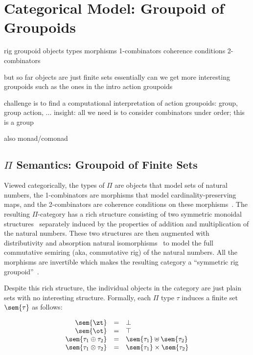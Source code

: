 \section{Categorical Model: Groupoid of Groupoids}
\label{sec:groupoids}

rig groupoid
objects types
morphisms 1-combinators
coherence conditions 2-combinators

but so far objects are just finite sets essentially
can we get more interesting groupoids such as the ones in the intro
action groupoids

challenge is to find a computational interpretation of action
groupoids: group, group action, ... insight: all we need is to
consider combinators under order; this is a group

also monad/comonad

\subsection{$\Pi$ Semantics: Groupoid of Finite Sets}

Viewed categorically, the types of $\Pi$ are objects that model sets
of natural numbers, the 1-combinators are morphisms that model
cardinality-preserving maps, and the 2-combinators are coherence
conditions on these morphisms~\cite{Carette2016}. The resulting
$\Pi$-category has a rich structure consisting of two symmetric
monoidal structures~\cite{nla.cat-vn1051288} separately induced by the
properties of addition and multiplication of the natural
numbers. These two structures are then augmented with distributivity
and absorption natural isomorphisms~\cite{laplaza} to model the full
commutative semiring (aka, commutative rig) of the natural
numbers. All the morphisms are invertible which makes the resulting
category a ``symmetric rig groupoid''~\cite{nlabrig}.

Despite this rich structure, the individual objects in the category
are just plain sets with no interesting structure. Formally, each
$\Pi$ type $\tau$ induces a finite set $\sem{\tau}$ as follows:

\[\begin{array}{rcl}
\sem{\zt} &=& \bot \\
\sem{\ot} &=& \top \\
\sem{\tau_1 \oplus \tau_2} &=& \sem{\tau_1} \uplus \sem{\tau_2} \\
\sem{\tau_1 \otimes \tau_2} &=& \sem{\tau_1} \times \sem{\tau_2} 
\end{array}\]

